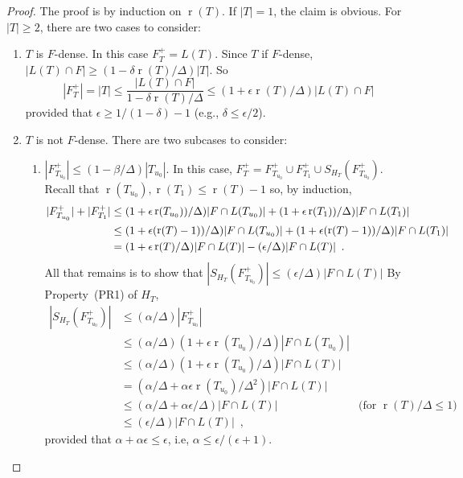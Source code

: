 \documentclass{patmorin}
\DeclareMathOperator{\rank}{r}
\begin{document}
\begin{proof}
  The proof is by induction on $\rank(T)$. If $|T|=1$, the claim is
  obvious. For $|T|\ge 2$, there are two cases to consider:
  \begin{enumerate}
    \item $T$ is $F$-dense. In this case $F^+_T=L(T)$.  
     Since $T$ if $F$-dense,  $|L(T)\cap F|\ge
     (1-\delta\rank(T)/\Delta)|T|$.  So
     \[
       |F^+_T|=|T|
	  \le \frac{|L(T)\cap F|}{1-\delta\rank(T)/\Delta} 
          \le (1+\epsilon\rank(T)/\Delta)|L(T)\cap F|
     \]
     provided that $\epsilon \ge 1/(1-\delta)-1$ (e.g., $\delta\le \epsilon/2$).

    \item $T$ is not $F$-dense. There are two subcases to consider:
    \begin{enumerate}
       \item $|F^+_{T_{u_0}}| \le (1-\beta/\Delta)|T_{u_0}|$.
         In this case, $F^+_T=F^+_{T_{u_0}}\cup F^+_{T_1} \cup S_{H_T}(F^+_{T_{u_0}})$.
         Recall that
        $\rank(T_{u_0}),\rank(T_1)\le\rank(T)-1$ so, by induction,
         \begin{align}
              |F^+_{T_{u_0}}| + |F^+_{T_{1}}| 
              & \le (1+\epsilon\rank(T_{u_0}))/\Delta)|F\cap L(T_{u_0})| 
                    +(1+\epsilon\rank(T_{1}))/\Delta)|F\cap L(T_{1})| \notag \\
              & \le (1+\epsilon(\rank(T)-1))/\Delta)|F\cap L(T_{u_0})| 
                    +(1+\epsilon(\rank(T)-1))/\Delta)|F\cap L(T_{1})|  \notag \\
              & = (1+\epsilon\rank(T)/\Delta)|F\cap L(T)| - (\epsilon/\Delta)|F\cap L(T)| \enspace .
            \eqlabel{inductio}
         \end{align}
         All that remains is to show that $|S_{H_T}(F^+_{T_{u_0}})|\le (\epsilon/\Delta)|F\cap L(T)|$  
         By
         Property~(PR1) of $H_T$,
          \begin{align*}
          |S_{H_T}(F^+_{T_{u_0}})| 
            & \le (\alpha/\Delta)|F^+_{T_{u_0}}| \\
            & \le (\alpha/\Delta)(1+\epsilon\rank(T_{u_0})/\Delta)|F\cap L(T_{u_0})| \\
            & \le (\alpha/\Delta)(1+\epsilon\rank(T_{u_0})/\Delta)|F\cap L(T)|\\
            & = (\alpha/\Delta+\alpha\epsilon\rank(T_{u_0})/\Delta^2)|F\cap L(T)| \\
            & \le (\alpha/\Delta+\alpha\epsilon/\Delta)|F\cap L(T)| 
    	     & \text{(for $\rank(T)/\Delta\le 1$)} \\
    	& \le (\epsilon/\Delta)|F\cap L(T)| \enspace ,
       \end{align*}
       provided that $\alpha+\alpha\epsilon \le \epsilon$, i.e, 
       $\alpha \le \epsilon/(\epsilon+1)$.   


\end{enumerate}
\end{enumerate}
\end{proof}
\end{document}
